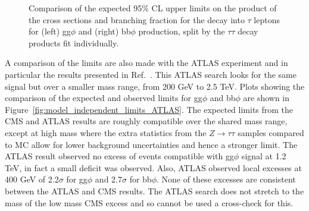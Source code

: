 \begin{figure}[!hbtp]
\centering
\caption{Comparison of the expected 95\% CL upper limits on the product of the cross sections and branching fraction for the decay into $\tau$ leptons for (left) gg$\phi$ and (right) bb$\phi$ production, split by the $\tau\tau$ decay products fit individually.}
\label{fig:model_independent_limits_by_channel}
\end{figure}

A comparison of the limits are also made with the ATLAS experiment and in particular the results presented in Ref.~\cite{ATLAS:2020zms}.
This ATLAS search looks for the same signal but over a smaller mass range, from 200 GeV to 2.5 TeV.
Plots showing the comparison of the expected and observed limits for gg$\phi$ and bb$\phi$ are shown in Figure~\ref{fig:model_independent_limits_ATLAS}.
The expected limits from the CMS and ATLAS results are roughly compatible over the shared mass range, except at high mass where the extra statistics from the $Z\rightarrow \tau\tau$ samples compared to MC allow for lower background uncertainties and hence a stronger limit.
The ATLAS result observed no excess of events compatible with gg$\phi$ signal at 1.2 TeV, in fact a small deficit was observed.
Also, ATLAS observed local excesses at 400 GeV of 2.2$\sigma$ for gg$\phi$ and 2.7$\sigma$ for bb$\phi$.
None of these excesses are consistent between the ATLAS and CMS results.
The ATLAS search does not stretch to the mass of the low mass CMS excess and so cannot be used a cross-check for this.

